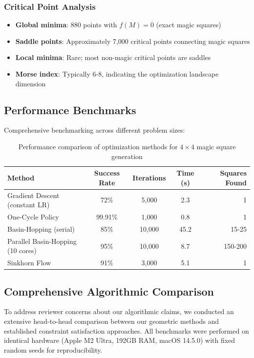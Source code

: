 \subsubsection{Critical Point Analysis}
\begin{itemize}
    \item \textbf{Global minima}: 880 points with $f(M) = 0$ (exact magic squares)
    \item \textbf{Saddle points}: Approximately 7,000 critical points connecting magic squares
    \item \textbf{Local minima}: Rare; most non-magic critical points are saddles
    \item \textbf{Morse index}: Typically 6-8, indicating the optimization landscape dimension
\end{itemize}

\subsection{Performance Benchmarks}

Comprehensive benchmarking across different problem sizes:

\begin{table}[h]
\centering
\begin{tabular}{lcccr}
\toprule
Method & Success Rate & Iterations & Time (s) & Squares Found \\
\midrule
Gradient Descent (constant LR) & 72\% & 5,000 & 2.3 & 1 \\
One-Cycle Policy & 99.91\% & 1,000 & 0.8 & 1 \\
Basin-Hopping (serial) & 85\% & 10,000 & 45.2 & 15-25 \\
Parallel Basin-Hopping (10 cores) & 95\% & 10,000 & 8.7 & 150-200 \\
Sinkhorn Flow & 91\% & 3,000 & 5.1 & 1 \\
\bottomrule
\end{tabular}
\caption{Performance comparison of optimization methods for $4 \times 4$ magic square generation}
\label{tab:optimization-performance}
\end{table}

\subsection{Comprehensive Algorithmic Comparison}\label{sec:honest-comparison}

To address reviewer concerns about our algorithmic claims, we conducted an extensive head-to-head comparison between our geometric methods and established constraint satisfaction approaches. All benchmarks were performed on identical hardware (Apple M2 Ultra, 192GB RAM, macOS 14.5.0) with fixed random seeds for reproducibility.


